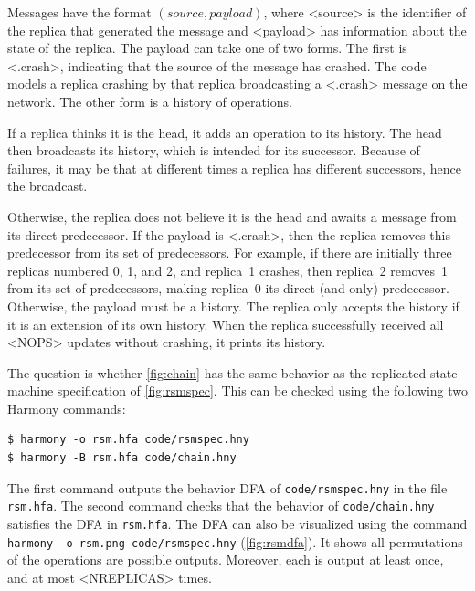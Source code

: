 \documentclass{report}
\newenvironment{code}{
\tcolorbox
}{
\endtcolorbox
}
\begin{document}
Messages have the format $(\mathit{source}, \mathit{payload})$,
where <{source}> is the identifier of the replica that generated
the message and <{payload}> has information about the state of
the replica.  The payload can take one of two forms.  The first is
<{.crash}>, indicating that the source of the message has
crashed.  The code models a replica crashing by that replica broadcasting
a <{.crash}> message on the network.
The other form is a history of operations.

If a replica thinks it is the head, it adds an operation to its
history.  The head then broadcasts its history, which
is intended for its successor.  Because of failures, it may be that
at different times a replica has different successors, hence the
broadcast.

Otherwise, the replica does not believe it is the head and
awaits a message from its direct predecessor.
If the payload is <{.crash}>, then the replica removes this
predecessor from its set of predecessors.  For example, if there
are initially three replicas numbered 0, 1, and 2, and replica~1
crashes, then replica~2 removes~1 from its set of predecessors, making
replica~0 its direct (and only) predecessor.
Otherwise, the payload must be a history.
The replica only accepts the history if it is an extension of its own
history.
When the replica successfully received all <{NOPS}> updates
without crashing, it prints its history.

The question is whether \autoref{fig:chain} has the same behavior as
the replicated state machine specification of \autoref{fig:rsmspec}.
This can be checked using the following two Harmony commands:
\begin{code}
\begin{verbatim}
$ harmony -o rsm.hfa code/rsmspec.hny
$ harmony -B rsm.hfa code/chain.hny
\end{verbatim}
\end{code}

The first command outputs the behavior DFA of \texttt{code/rsmspec.hny}
in the file \texttt{rsm.hfa}.
The second command checks that the behavior of \texttt{code/chain.hny}
satisfies the DFA in \texttt{rsm.hfa}.
The DFA can also be visualized using the command
\texttt{harmony -o rsm.png code/rsmspec.hny}
(\autoref{fig:rsmdfa}).
It shows all permutations of the operations are possible outputs.
Moreover, each is output at least once, and at most
<{NREPLICAS}> times.
\end{document}
